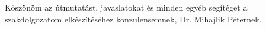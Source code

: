 \chapter*{\koszonetnyilvanitas}

Köszönöm az útmutatást, javaslatokat és minden egyéb segítéget a szakdolgozatom elkészítéséhez konzulensemnek,  Dr. Mihajlik Péternek.